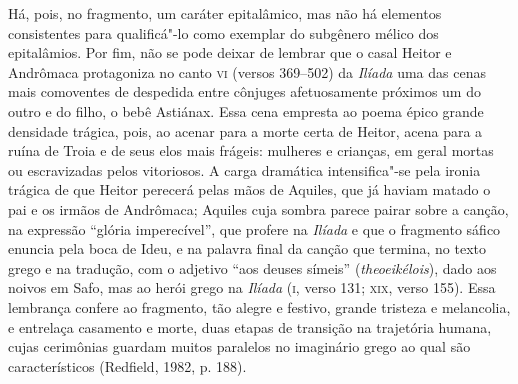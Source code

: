 {{Há, pois, no fragmento, um caráter epitalâmico, mas não há elementos consistentes para
qualificá"-lo como exemplar do subgênero mélico dos epitalâmios. Por fim, não se
pode deixar de lembrar que o casal Heitor e Andrômaca protagoniza no canto \textsc{vi}
(versos 369--502) da \textit{Ilíada} uma das cenas mais comoventes de despedida
entre cônjuges afetuosamente próximos um do outro e do filho, o bebê Astiánax.
Essa cena empresta ao poema épico grande densidade trágica, pois, ao acenar
para a morte certa de Heitor, acena para a ruína de Troia e de seus elos mais
frágeis: mulheres e crianças, em geral mortas ou escravizadas pelos vitoriosos.
A carga dramática intensifica"-se pela ironia trágica de que Heitor perecerá
pelas mãos de Aquiles, que já haviam matado o pai e os irmãos de Andrômaca; Aquiles cuja sombra parece pairar sobre a canção, na expressão ``glória imperecível'', que profere na \textit{Ilíada} e que o fragmento sáfico enuncia pela boca de Ideu, e na palavra final da canção que termina, no texto grego e na tradução, com o adjetivo ``aos deuses símeis'' (\textit{theoeikélois}), dado aos noivos em Safo, mas ao herói grego na \textit{Ilíada} (\textsc{i}, verso 131; \textsc{xix}, verso 155).
Essa lembrança confere ao fragmento, tão alegre e festivo, grande tristeza e
melancolia, e entrelaça casamento e morte, duas etapas de transição na trajetória
humana, cujas cerimônias guardam muitos paralelos no imaginário grego ao qual são característicos (Redfield, 1982, p. 188).}

}
